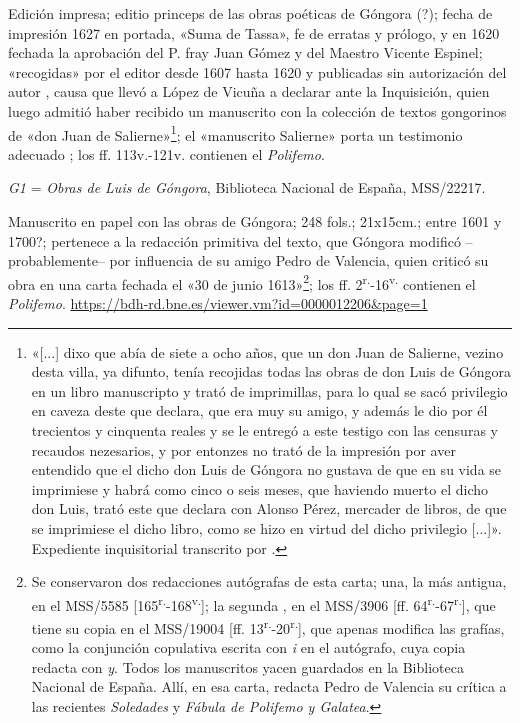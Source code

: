 \documentclass[11pt,a4paper,twoside]{article}
\newcommand{\comillas}[1]{«#1»}
\begin{document}
Edición impresa; editio princeps de las obras poéticas de Góngora (?); fecha de impresión 1627 en portada, «Suma de Tassa», fe de erratas y prólogo, y en 1620 fechada la aprobación del P. fray Juan Gómez y del Maestro Vicente Espinel; «recogidas» por el editor desde 1607 hasta 1620 y publicadas sin autorización del autor \parencite{Alonso1963}, causa que llevó a López de Vicuña a declarar ante la Inquisición, quien luego admitió haber recibido un manuscrito con la colección de textos gongorinos de «don Juan de Salierne»\footnote{\comillas{[...] dixo que abía de siete a ocho años, que un don Juan de Salierne, vezino desta villa, ya difunto, tenía recojidas todas las obras de don Luis de Góngora en un libro manuscripto y trató de imprimillas, para lo qual se sacó privilegio en caveza deste que declara, que era muy su amigo, y además le dio por él trecientos y cinquenta reales y se le entregó a este testigo con las censuras y recaudos nezesarios, y por entonzes no trató de la impresión por aver entendido que el dicho don Luis de Góngora no gustava de que en su vida se imprimiese y habrá como cinco o seis meses, que haviendo muerto el dicho don Luis, trató este que declara con Alonso Pérez, mercader de libros, de que se imprimiese el dicho libro, como se hizo en virtud del dicho privilegio [...]}. Expediente inquisitorial transcrito por \textcite{Moll1997}.}; el \comillas{manuscrito Salierne} porta un testimonio adecuado \parencite{Alonso1963}; los ff. 113v.-121v. contienen el \textit{Polifemo}.\vspace{5pt}

\textit{G1} = \textit{Obras de Luis de Góngora}, Biblioteca Nacional de España, MSS/22217. 

Manuscrito en papel con las obras de Góngora; 248 fols.; 21x15cm.; entre 1601 y 1700?; pertenece a la redacción primitiva del texto, que Góngora modificó --probablemente-- por influencia de su amigo Pedro de Valencia, quien criticó su obra en una carta fechada el «30 de junio 1613»\footnote{Se conservaron dos redacciones autógrafas de esta carta; una, la más antigua, en el MSS/5585 [165\textsuperscript{r.}-168\textsuperscript{v.}]; la segunda \parencite{PérezLópez1988}, en el MSS/3906 [ff. 64\textsuperscript{r.}-67\textsuperscript{r.}], que tiene su copia en el MSS/19004 [ff. 13\textsuperscript{r.}-20\textsuperscript{r.}], que apenas modifica las grafías, como la conjunción copulativa escrita con \textit{i} en el autógrafo, cuya copia redacta con \textit{y}. Todos los manuscritos yacen guardados en la Biblioteca Nacional de España. Allí, en esa carta, redacta Pedro de Valencia su crítica a las recientes \textit{Soledades} y \textit{Fábula de Polifemo y Galatea}.}; los ff. 2\textsuperscript{r.}-16\textsuperscript{v.} contienen el \textit{Polifemo}. \url{https://bdh-rd.bne.es/viewer.vm?id=0000012206&page=1}\vspace{5pt}
\end{document}
